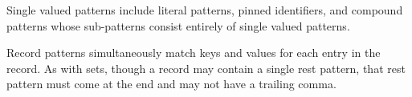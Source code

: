 Single valued patterns include literal patterns, pinned identifiers, and compound
patterns whose sub-patterns consist entirely of single valued patterns.

\begin{prooftree}
\end{prooftree}

\begin{prooftree}
\end{prooftree}

Record patterns simultaneously match keys and values for each entry in
the record. As with sets, though a record may contain a single rest pattern,
that rest pattern must come at the end and may not have a trailing comma.

\begin{bnf*}
     \\
     \\
     \\
     \\
     \\
     \\
\end{bnf*}

